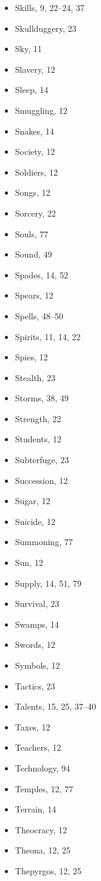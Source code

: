 \begin{multicols}{2}
\begin{itemize}
  \item Skills, 9, 22--24, 37
  \item Skullduggery, 23
  \item Sky, 11
  \item Slavery, 12
  \item Sleep, 14
  \item Smuggling, 12
  \item Snakes, 14
  \item Society, 12
  \item Soldiers, 12
  \item Songs, 12
  \item Sorcery, 22
  \item Souls, 77
  \item Sound, 49
  \item Spades, 14, 52
  \item Spears, 12
  \item Spells, 48--50
  \item Spirits, 11, 14, 22
  \item Spies, 12
  \item Stealth, 23
  \item Storms, 38, 49
  \item Strength, 22
  \item Students, 12
  \item Subterfuge, 23
  \item Succession, 12
  \item Sugar, 12
  \item Suicide, 12
  \item Summoning, 77
  \item Sun, 12
  \item Supply, 14, 51, 79
  \item Survival, 23
  \item Swamps, 14
  \item Swords, 12
  \item Symbols, 12
  \item Tactics, 23
  \item Talents, 15, 25, 37--40
  \item Taxes, 12
  \item Teachers, 12
  \item Technology, 94
  \item Temples, 12, 77
  \item Terrain, 14
  \item Theocracy, 12
  \item Theona, 12, 25
  \item Thepyrgos, 12, 25

\end{itemize}
\end{multicols}
